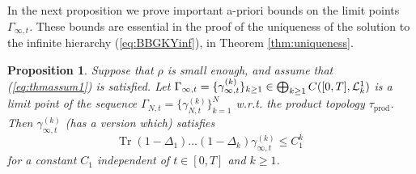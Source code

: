 \documentclass[11pt]{article}
\newtheorem{proposition}[theorem]{Proposition}
\newcommand{\tr}{\mbox{Tr}}
\newcommand{\cL}{{\cal L}}
\begin{document}
In the next proposition we prove important a-priori bounds on the
limit points $ \Gamma_{\infty,t}$. These bounds are essential in the
proof of the uniqueness of the solution to the infinite hierarchy
(\ref{eq:BBGKYinf}), in Theorem \ref{thm:uniqueness}.


\begin{proposition}\label{prop:apriorik}
Suppose that $\rho$  is small enough, and assume that
(\ref{eq:thmassum1}) is satisfied. Let $\Gamma_{\infty,t} = \{
\gamma_{\infty,t}^{(k)}\}_{k \geq 1} \in \bigoplus_{k \geq 1}
C([0,T], \cL^1_k)$ is a limit point of the sequence $\Gamma_{N,t} =
\{  \gamma_{N,t}^{(k)} \}_{k=1}^N$ w.r.t. the product topology
$\tau_{\text{prod}}$. Then $ \gamma_{\infty,t}^{(k)}$ (has a version
which) satisfies
\begin{equation}\label{eq:apriorik}
\tr \; (1-\Delta_1) \dots (1-\Delta_k) \gamma_{\infty,t}^{(k)} \leq
C_1^k
\end{equation}
for a constant $C_1$ independent of $t \in [0,T]$ and $k \geq 1$.
\end{proposition}
\end{document}

